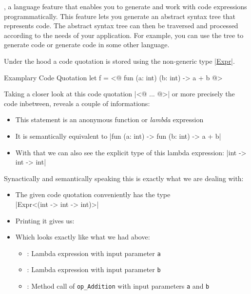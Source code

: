 \begin{mycitation}[title={\fs{} Documentation: \href{https://learn.microsoft.com/en-us/dotnet/fsharp/language-reference/code-quotations}{Code Quotations}}]
    \elide, a language feature that enables you to generate and work with \fs{} code expressions programmatically.
    This feature lets you generate an abstract syntax tree that represents \fs{} code.
    The abstract syntax tree can then be traversed and processed according to the needs of your application.
    For example, you can use the tree to generate \fs{} code or generate code in some other language.
\end{mycitation}
Under the hood a code quotation is stored using the non-generic type \href{https://fsharp.github.io/fsharp-core-docs/reference/fsharp-quotations-fsharpexpr.html}{\fsharp|Expr|}.
\begin{fsharpcodeshort}{Examplary Code Quotation}{}
let f = <@ fun (a: int) (b: int) -> a + b @>
\end{fsharpcodeshort}
\noindent Taking a closer look at this code quotation \fsharp|<@ ... @>| or more precisely the code inbetween, reveals a couple of informations:
\begin{itemize}[nosep]
    \item This statement is an anonymous function or \textit{lambda} expression
    \item It is semantically equivalent to \fsharp|fun (a: int) -> fun (b: int) -> a + b|
    \item With that we can also see the explicit type of this lambda expression: \fsharp|int -> int -> int|
\end{itemize}
Synactically and semantically speaking this is exactly what we are dealing with:
\begin{itemize}[nosep]
    \item The given code quotation conveniently has the type\\
        \fsharp|Expr<(int -> int -> int)>|
    \item Printing it gives us:\\
    \item Which looks exactly like what we had above:
        \begin{itemize}[nosep]
            \item {}: Lambda expression with input parameter \texttt{a}
            \item {}: Lambda expression with input parameter \texttt{b}
            \item {}: Method call of \texttt{op\_Addition} with input parameters \texttt{a} and \texttt{b}
        \end{itemize}
\end{itemize}

